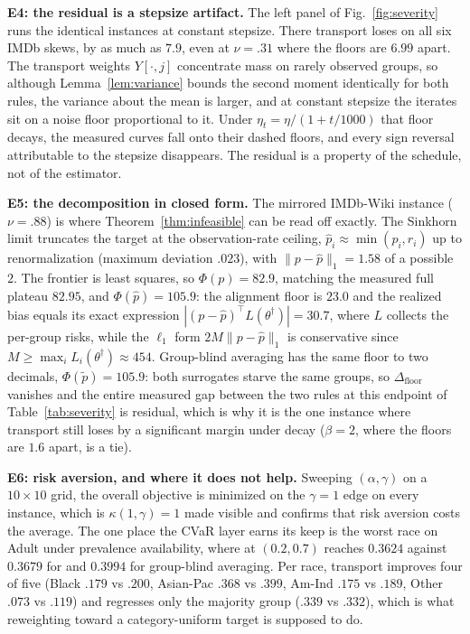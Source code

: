 \noindent\textbf{E4: the residual is a stepsize artifact.}
The left panel of Fig.~\ref{fig:severity} runs the identical instances at
constant stepsize. There transport loses on all six IMDb skews, by as much as
$7.9$, even at $\nu{=}.31$ where the floors are $6.99$ apart. The transport
weights $Y[\cdot,j]$ concentrate mass on rarely observed groups, so although
Lemma~\ref{lem:variance} bounds the second moment identically for both rules,
the variance about the mean is larger, and at constant stepsize the iterates sit
on a noise floor proportional to it. Under $\eta_t=\eta/(1+t/1000)$ that floor
decays, the measured curves fall onto their dashed floors, and every sign
reversal attributable to the stepsize disappears. The residual is a property of
the schedule, not of the estimator.

\noindent\textbf{E5: the decomposition in closed form.}
The mirrored IMDb-Wiki instance ($\nu{=}.88$) is where
Theorem~\ref{thm:infeasible} can be read off exactly. The Sinkhorn limit
truncates the target at the observation-rate ceiling,
$\hat p_i\approx\min(p_i,r_i)$ up to renormalization (maximum deviation
$.023$), with $\|p-\hat p\|_1=1.58$ of a possible $2$. The frontier is least
squares, so $\Phi(p)=82.9$, matching the measured full plateau $82.95$, and
$\Phi(\hat p)=105.9$: the alignment floor is $23.0$ and the realized bias
equals its exact expression $|(p-\hat p)^\top L(\theta^\dagger)|=30.7$, where
$L$ collects the per-group risks, while the $\ell_1$ form $2M\|p-\hat p\|_1$
is conservative since $M\ge\max_i L_i(\theta^\dagger)\approx 454$.
Group-blind averaging has the same floor to two decimals,
$\Phi(\tilde p)=105.9$: both surrogates starve the same groups, so
$\Delta_{\mathrm{floor}}$ vanishes and the entire measured gap between the
two rules at this endpoint of Table~\ref{tab:severity} is residual, which is
why it is the one instance where transport still loses by a significant
margin under decay ($\beta{=}2$, where the floors are $1.6$ apart, is a tie).

\noindent\textbf{E6: risk aversion, and where it does not help.}
Sweeping $(\alpha,\gamma)$ on a $10\times10$ grid, the overall objective is
minimized on the $\gamma=1$ edge on every instance, which is
$\kappa(1,\gamma)=1$ made visible and confirms that risk aversion costs the
average. The one place the CVaR layer earns its keep is the worst race on Adult
under prevalence availability, where \avotcvar{} at $(0.2,0.7)$ reaches
$0.3624$ against $0.3679$ for \avot{} and $0.3994$ for group-blind averaging.
Per race, transport improves four of five (Black $.179$ vs $.200$, Asian-Pac
$.368$ vs $.399$, Am-Ind $.175$ vs $.189$, Other $.073$ vs $.119$) and regresses
only the majority group ($.339$ vs $.332$), which is what reweighting toward a
category-uniform target is supposed to do.

